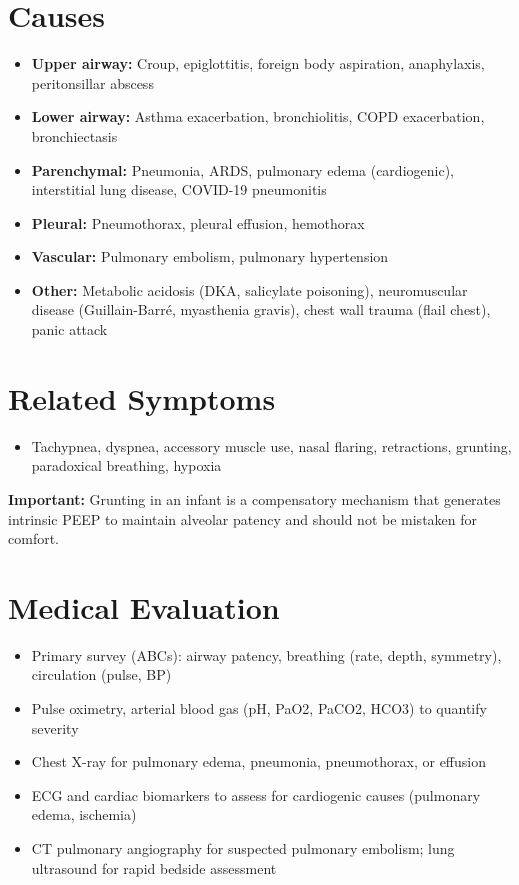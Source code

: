 \section*{Causes}
\begin{itemize}
  \item \textbf{Upper airway:} Croup, epiglottitis, foreign body aspiration, anaphylaxis, peritonsillar abscess
  \item \textbf{Lower airway:} Asthma exacerbation, bronchiolitis, COPD exacerbation, bronchiectasis
  \item \textbf{Parenchymal:} Pneumonia, ARDS, pulmonary edema (cardiogenic), interstitial lung disease, COVID-19 pneumonitis
  \item \textbf{Pleural:} Pneumothorax, pleural effusion, hemothorax
  \item \textbf{Vascular:} Pulmonary embolism, pulmonary hypertension
  \item \textbf{Other:} Metabolic acidosis (DKA, salicylate poisoning), neuromuscular disease (Guillain-Barr\'e, myasthenia gravis), chest wall trauma (flail chest), panic attack
\end{itemize}

\section*{Related Symptoms}
\begin{itemize}
  \item Tachypnea, dyspnea, accessory muscle use, nasal flaring, retractions, grunting, paradoxical breathing, hypoxia
\end{itemize}
\textbf{Important:} Grunting in an infant is a compensatory mechanism that generates intrinsic PEEP to maintain alveolar patency and should not be mistaken for comfort.

\section*{Medical Evaluation}
\begin{itemize}
  \item Primary survey (ABCs): airway patency, breathing (rate, depth, symmetry), circulation (pulse, BP)
  \item Pulse oximetry, arterial blood gas (pH, PaO2, PaCO2, HCO3) to quantify severity
  \item Chest X-ray for pulmonary edema, pneumonia, pneumothorax, or effusion
  \item ECG and cardiac biomarkers to assess for cardiogenic causes (pulmonary edema, ischemia)
  \item CT pulmonary angiography for suspected pulmonary embolism; lung ultrasound for rapid bedside assessment
\end{itemize}

